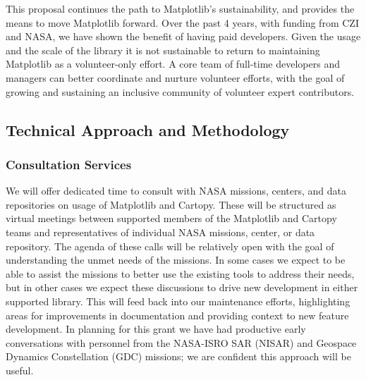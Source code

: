 \documentclass[12pt]{article}
\numberwithin{page}{section}
\begin{document}
This proposal continues the path to Matplotlib's sustainability, and provides the means to
move Matplotlib forward.  Over the past 4 years, with funding from CZI and NASA, we have
shown the benefit of having paid developers.
Given the usage and the scale of
the library it is not sustainable to return to maintaining Matplotlib as a
volunteer-only effort.  A core team of full-time developers and managers can
better coordinate and nurture volunteer efforts, with the goal of growing and
sustaining an inclusive community of volunteer expert contributors.


\subsection{Technical Approach and Methodology}


\subsubsection{Consultation Services}

We will offer dedicated time to consult with NASA missions, centers, and data
repositories on usage of Matplotlib and Cartopy.  These will be structured as
virtual meetings between supported members of the Matplotlib and Cartopy teams
and representatives of individual NASA missions, center, or data repository.
The agenda of these calls will be relatively open with the goal of
understanding the unmet needs of the missions.  In some cases we expect to be
able to assist the missions to better use the existing tools to address their
needs, but in other cases we expect these discussions to drive new development
in either supported library.  This will feed back into our maintenance efforts,
highlighting areas for improvements in documentation and providing context to
new feature development.  In planning for this grant we have had productive early
conversations with personnel from the NASA-ISRO SAR (NISAR) and Geospace Dynamics Constellation
(GDC) missions; we are confident this approach will be useful.
\end{document}
